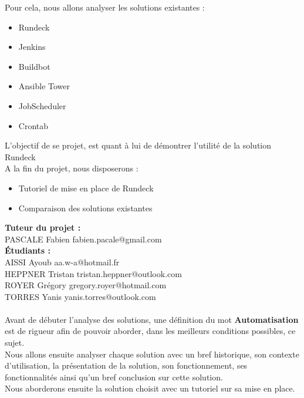 \documentclass[12pt]{article}
\begin{document}
Pour cela, nous allons analyser les solutions existantes :
\begin{itemize}
    \item Rundeck
    \item Jenkins
    \item Buildbot
    \item Ansible Tower
    \item JobScheduler
    \item Crontab
\end{itemize}
\vspace{0.5cm}
L'objectif de se projet, est quant à lui de démontrer l'utilité de la solution Rundeck
\vspace{0.5cm}
\\
A la fin du projet, nous disposerons :
\begin{itemize}
    \item Tutoriel de mise en place de Rundeck
    \item Comparaison des solutions existantes
\end{itemize}
\vspace{0.5cm}
\textbf{Tuteur du projet : }
\\
PASCALE Fabien \hspace{3.3cm} fabien.pacale@gmail.com
\vspace{0.5cm}
\\
\textbf{Étudiants : }
\\
AISSI Ayoub \hspace{4.2cm} aa.w-a@hotmail.fr
\\ 
HEPPNER Tristan \hspace{3.2cm} tristan.heppner@outlook.com
\\ 
ROYER Grégory \hspace{3.5cm} gregory.royer@hotmail.com
\\ 
TORRES Yanis \hspace{3.7cm} yanis.torres@outlook.com
\\
\vspace{0.5cm}
\\
Avant de débuter l'analyse des solutions, une définition du mot \textbf{Automatisation} est de rigueur afin de pouvoir aborder, dans les meilleurs conditions possibles, ce sujet.
\\
Nous allons ensuite analyser chaque solution avec un bref historique, son contexte d'utilisation, la présentation de la solution, son fonctionnement, ses fonctionnalités ainsi qu'un bref conclusion sur cette solution.
\\
Nous aborderons ensuite la solution choisit avec un tutoriel sur sa mise en place.
\end{document}
